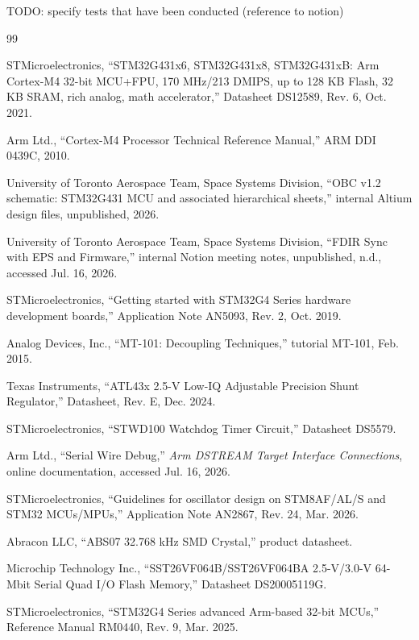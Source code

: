 \documentclass[10pt]{../datasheet}
\begin{document}
TODO: specify tests that have been conducted (reference to notion)

\begin{thebibliography}{99}

  STMicroelectronics,
  ``STM32G431x6, STM32G431x8, STM32G431xB: Arm Cortex-M4 32-bit
  MCU+FPU, 170 MHz/213 DMIPS, up to 128 KB Flash, 32 KB SRAM,
  rich analog, math accelerator,''
  Datasheet DS12589, Rev. 6, Oct. 2021.

  Arm Ltd.,
  ``Cortex-M4 Processor Technical Reference Manual,''
  ARM DDI 0439C, 2010.

  University of Toronto Aerospace Team, Space Systems Division,
  ``OBC v1.2 schematic: STM32G431 MCU and associated hierarchical
  sheets,'' internal Altium design files, unpublished, 2026.

  University of Toronto Aerospace Team, Space Systems Division,
  ``FDIR Sync with EPS and Firmware,'' internal Notion meeting notes,
  unpublished, n.d., accessed Jul. 16, 2026.

  STMicroelectronics,
  ``Getting started with STM32G4 Series hardware development boards,''
  Application Note AN5093, Rev. 2, Oct. 2019.

  Analog Devices, Inc.,
  ``MT-101: Decoupling Techniques,'' tutorial MT-101, Feb. 2015.

  Texas Instruments,
  ``ATL43x 2.5-V Low-IQ Adjustable Precision Shunt Regulator,''
  Datasheet, Rev. E, Dec. 2024.

  STMicroelectronics,
  ``STWD100 Watchdog Timer Circuit,'' Datasheet DS5579.

  Arm Ltd.,
  ``Serial Wire Debug,'' \textit{Arm DSTREAM Target Interface
  Connections}, online documentation, accessed Jul. 16, 2026.

  STMicroelectronics,
  ``Guidelines for oscillator design on STM8AF/AL/S and STM32 MCUs/MPUs,''
  Application Note AN2867, Rev. 24, Mar. 2026.

  Abracon LLC,
  ``ABS07 32.768 kHz SMD Crystal,'' product datasheet.

  Microchip Technology Inc.,
  ``SST26VF064B/SST26VF064BA 2.5-V/3.0-V 64-Mbit Serial Quad I/O
  Flash Memory,'' Datasheet DS20005119G.

  STMicroelectronics,
  ``STM32G4 Series advanced Arm-based 32-bit MCUs,''
  Reference Manual RM0440, Rev. 9, Mar. 2025.

\end{thebibliography}
\end{document}
